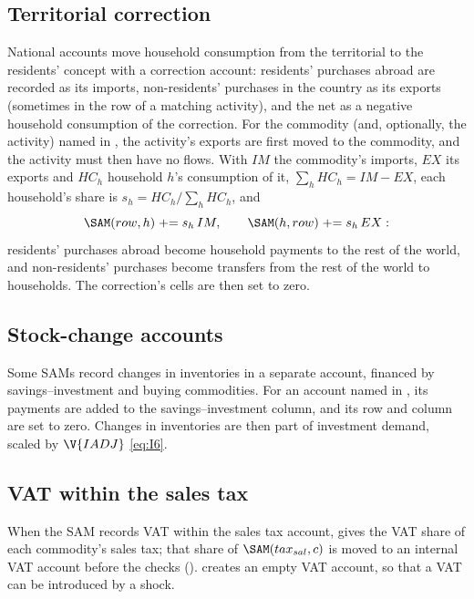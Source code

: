 \subsection{Territorial correction}

National accounts move household consumption from the territorial to the
residents' concept with a correction account: residents' purchases abroad are
recorded as its imports, non-residents' purchases in the country as its
exports (sometimes in the row of a matching activity), and the net as a
negative household consumption of the correction. For the commodity (and,
optionally, the activity) named in , the activity's exports
are first moved to the commodity, and the activity must then have no flows.
With $IM$ the commodity's imports, $EX$ its exports and $HC_h$ household $h$'s
consumption of it, $\sum_h HC_h = IM - EX$, each household's share is
$s_h = HC_h / \sum_h HC_h$, and
\begin{equation*}
\SAM(row, h) \mathrel{+}= s_h\,IM, \qquad \SAM(h, row) \mathrel{+}= s_h\,EX:
\end{equation*}
residents' purchases abroad become household payments to the rest of the
world, and non-residents' purchases become transfers from the rest of the
world to households. The correction's cells are then set to zero.

\subsection{Stock-change accounts}

Some SAMs record changes in inventories in a separate account, financed by
savings--investment and buying commodities. For an account named in
, its payments are added to the savings--investment column, and
its row and column are set to zero. Changes in inventories are then part of
investment demand, scaled by $\V{IADJ}$ \eqref{eq:I6}.

\subsection{VAT within the sales tax}

When the SAM records VAT within the sales tax account,  gives
the VAT share of each commodity's sales tax; that share of
$\SAM(tax_{sal}, c)$ is moved to an internal VAT account before the checks
().  creates an empty VAT account, so that a
VAT can be introduced by a shock.

